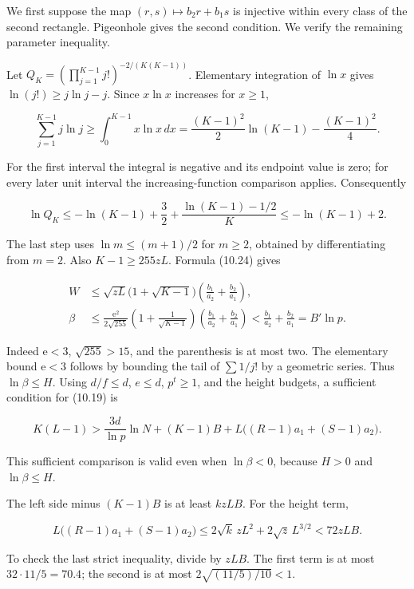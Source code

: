 \documentclass[
  11pt,
  a4paper,
]{article}
\begin{document}
We first suppose the map \((r,s)\mapsto b_2r+b_1s\) is injective within
every class of the second rectangle. Pigeonhole gives the second
condition. We verify the remaining parameter inequality.

Let \(Q_K=(\prod_{j=1}^{K-1}j!)^{-2/(K(K-1))}\). Elementary integration
of \(\ln x\) gives \(\ln(j!)\ge j\ln j-j\). Since \(x\ln x\) increases
for \(x\ge1\),

\[
\sum_{j=1}^{K-1}j\ln j
\ge\int_0^{K-1}x\ln x\,dx
=\frac{(K-1)^2}2\ln(K-1)-\frac{(K-1)^2}4.
\]

For the first interval the integral is negative and its endpoint value
is zero; for every later unit interval the increasing-function
comparison applies. Consequently

\[
\ln Q_K\le-\ln(K-1)+\frac32
+\frac{\ln(K-1)-1/2}{K}
\le-\ln(K-1)+2.
\tag{10.26}
\]

The last step uses \(\ln m\le(m+1)/2\) for \(m\ge2\), obtained by
differentiating from \(m=2\). Also \(K-1\ge255zL\). Formula (10.24)
gives

\[
\begin{aligned}
W&\le\sqrt{zL}\bigl(1+\sqrt{K-1}\bigr)
\left(\frac{b_1}{a_2}+\frac{b_2}{a_1}\right),\\
\beta&\le\frac{\mathrm e^2}{2\sqrt{255}}
\left(1+\frac1{\sqrt{K-1}}\right)
\left(\frac{b_1}{a_2}+\frac{b_2}{a_1}\right)
<\frac{b_1}{a_2}+\frac{b_2}{a_1}=B'\ln p.
\end{aligned}
\tag{10.27}
\]

Indeed \(\mathrm e<3\), \(\sqrt{255}>15\), and the parenthesis is at
most two. The elementary bound \(\mathrm e<3\) follows by bounding the
tail of \(\sum1/j!\) by a geometric series. Thus \(\ln\beta\le H\).
Using \(d/f\le d\), \(e\le d\), \(p^t\ge1\), and the height budgets, a
sufficient condition for (10.19) is

\[
K(L-1)>\frac{3d}{\ln p}\ln N
+(K-1)B+L\bigl((R-1)a_1+(S-1)a_2\bigr).
\tag{10.28}
\]

This sufficient comparison is valid even when \(\ln\beta<0\), because
\(H>0\) and \(\ln\beta\le H\).

The left side minus \((K-1)B\) is at least \(k z L B\). For the height
term,

\[
L\bigl((R-1)a_1+(S-1)a_2\bigr)
\le2\sqrt{k}\,zL^2+2\sqrt z\,L^{3/2}
<72zLB.
\tag{10.29}
\]

To check the last strict inequality, divide by \(zLB\). The first term
is at most \(32\cdot11/5=70.4\); the second is at most
\(2\sqrt{(11/5)/10}<1\).
\end{document}
